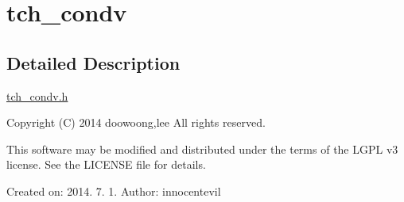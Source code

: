 \hypertarget{group___t_c_h___c_o_n_d_v}{\section{tch\+\_\+condv}
\label{group___t_c_h___c_o_n_d_v}
}


\subsection{Detailed Description}
\hyperlink{tch__condv_8h_source}{tch\+\_\+condv.\+h}

Copyright (C) 2014 doowoong,lee All rights reserved.

This software may be modified and distributed under the terms of the L\+G\+P\+L v3 license. See the L\+I\+C\+E\+N\+S\+E file for details.

Created on\+: 2014. 7. 1. Author\+: innocentevil 